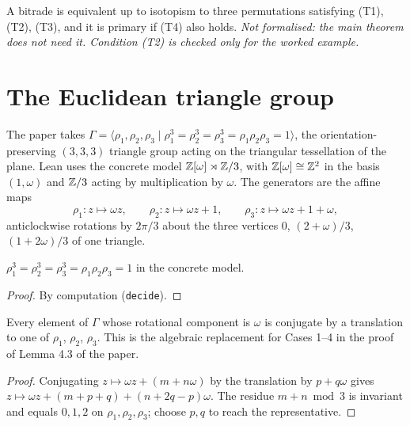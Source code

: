 \begin{theorem}\label{thm:drapal}
  A bitrade is equivalent up to isotopism to three permutations satisfying
  (T1), (T2), (T3), and it is primary if (T4) also holds.
  \emph{Not formalised: the main theorem does not need it. Condition (T2)
  is checked only for the worked example.}
\end{theorem}

\chapter{The Euclidean triangle group}

\begin{definition}\label{def:gamma}
  \leanok
  The paper takes
  $\Gamma = \langle \rho_1, \rho_2, \rho_3 \mid
    \rho_1^3 = \rho_2^3 = \rho_3^3 = \rho_1\rho_2\rho_3 = 1 \rangle$,
  the orientation-preserving $(3,3,3)$ triangle group acting on the
  triangular tessellation of the plane.
  Lean uses the concrete model $\mathbb{Z}[\omega] \rtimes \mathbb{Z}/3$, with
  $\mathbb{Z}[\omega] \cong \mathbb{Z}^2$ in the basis $(1, \omega)$ and $\mathbb{Z}/3$ acting by
  multiplication by $\omega$. The generators are the affine maps
  \[
    \rho_1 \colon z \mapsto \omega z, \qquad
    \rho_2 \colon z \mapsto \omega z + 1, \qquad
    \rho_3 \colon z \mapsto \omega z + 1 + \omega,
  \]
  anticlockwise rotations by $2\pi/3$ about the three vertices
  $0$, $(2 + \omega)/3$, $(1 + 2\omega)/3$ of one triangle.
\end{definition}

\begin{lemma}[Relations]\label{lem:rho-relations}
  \leanok
  $\rho_1^3 = \rho_2^3 = \rho_3^3 = \rho_1\rho_2\rho_3 = 1$ in the concrete
  model.
\end{lemma}
\begin{proof}\leanok
  By computation (\texttt{decide}).
\end{proof}

\begin{lemma}\label{lem:conjugate}
  \leanok
  Every element of $\Gamma$ whose rotational component is $\omega$ is
  conjugate by a translation to one of $\rho_1$, $\rho_2$, $\rho_3$.
  This is the algebraic replacement for Cases 1--4 in the proof of
  Lemma 4.3 of the paper.
\end{lemma}
\begin{proof}\leanok
  Conjugating $z \mapsto \omega z + (m + n\omega)$ by the translation
  by $p + q\omega$ gives $z \mapsto \omega z + (m + p + q) + (n + 2q - p)\omega$.
  The residue $m + n \bmod 3$ is invariant and equals $0, 1, 2$ on
  $\rho_1, \rho_2, \rho_3$; choose $p, q$ to reach the representative.
\end{proof}

